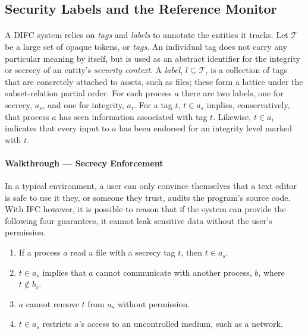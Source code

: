 \subsection{Security Labels and the Reference Monitor}

\paragraph{} A DIFC system relies on \textit{tags} and \textit{labels} to annotate the entities it tracks. Let $\mathcal{T}$ be a large set of opaque tokens, or \textit{tags}. An individual tag does not carry any particular meaning by itself, but is used as an abstract identifier for the integrity or secrecy of an entity's \textit{security context}. A \textit{label}, $l \subseteq \mathcal{T}$, is a collection of tags that are concretely attached to assets, such as files; these form a lattice under the subset-relation partial order. For each process $a$ there are two labels, one for secrecy, $a_s$, and one for integrity, $a_i$. For a tag $t$, $t \in a_s$ implies, conservatively, that process $a$ has seen information associated with tag $t$. Likewise, $t \in a_i$ indicates that every input to $a$ has been endorsed for an integrity level marked with $t$.

\paragraph{Walkthrough --- Secrecy Enforcement} In a typical environment, a user can only convince themselves that a text editor is safe to use it they, or someone they trust, audits the program's source code. With IFC however, it is possible to reason that if the system can provide the following four guarantees, it cannot leak sensitive data without the user's permission.

\begin{enumerate}
    \item If a process $a$ read a file with a secrecy tag $t$, then $t \in a_s$.
    \item $t \in a_s$ implies that $a$ cannot communicate with another process, $b$, where $t \notin b_s$.
    \item $a$ cannot remove $t$ from $a_s$ without permission.
    \item $t \in a_s$ restricts $a$'s access to an uncontrolled medium, such as a network.
\end{enumerate}

